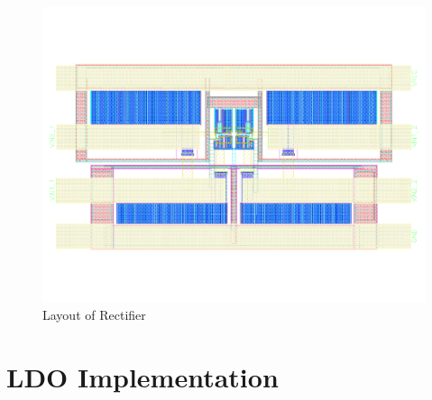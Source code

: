 \documentclass[12pt,a4paper,UKenglish]{report}
\begin{document}
\begin{appendices}
\begin{figure} [!htbp] %
 	\centering
  	\includegraphics[width=\textwidth]{appendix/layout_rectifier_l.pdf} 
 	\caption{Layout of Rectifier} 
	\label{fig:appen_layout_rectifer} 
\end{figure}


\chapter{LDO Implementation}


\end{appendices}
\end{document}
